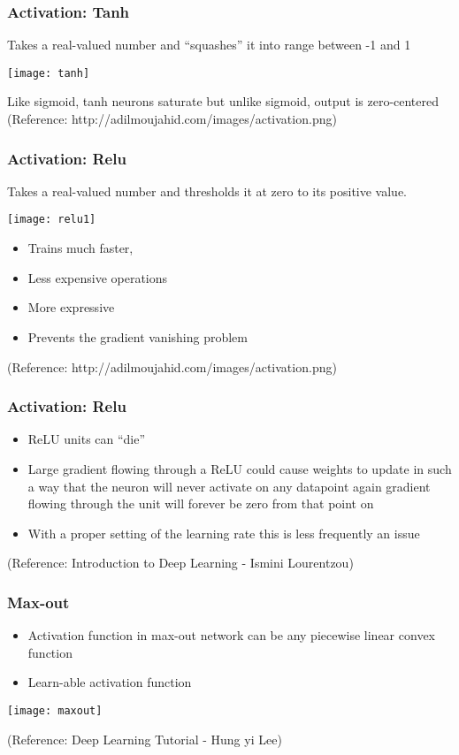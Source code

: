 \begin{frame}[fragile] \frametitle{Activation: Tanh}
Takes a real-valued number and ``squashes'' it into range between -1 and 1

\begin{center}
\texttt{[image: tanh]}
\end{center}
Like sigmoid, tanh neurons saturate but unlike sigmoid, output is zero-centered
\tiny{(Reference: http://adilmoujahid.com/images/activation.png)}
\end{frame}


\begin{frame}[fragile] \frametitle{Activation: Relu}
Takes a real-valued number and thresholds it at zero to its positive value.

\begin{center}
\texttt{[image: relu1]}
\end{center}
\begin{itemize}
\item Trains much faster, 
\item Less expensive operations
\item More expressive 
\item Prevents the gradient vanishing problem
\end{itemize}
\tiny{(Reference: http://adilmoujahid.com/images/activation.png)}
\end{frame}


\begin{frame}[fragile] \frametitle{Activation: Relu}
\begin{itemize}
\item ReLU units can ``die''
\item Large gradient flowing through a ReLU could cause weights to update in such a way that the neuron will never activate on any datapoint again
gradient flowing through the unit will forever be zero from that point on
\item With a proper setting of the learning rate this is less frequently an issue
\end{itemize}
\tiny{(Reference: Introduction to Deep Learning - Ismini Lourentzou)}
\end{frame}


\begin{frame}[fragile] \frametitle{Max-out}
\begin{itemize}
\item Activation function in max-out network can be any piecewise linear convex function
\item Learn-able activation function 
\end{itemize}


\begin{center}
\texttt{[image: maxout]}
\end{center}
\tiny{(Reference:  Deep Learning Tutorial - Hung yi Lee)}
\end{frame}

